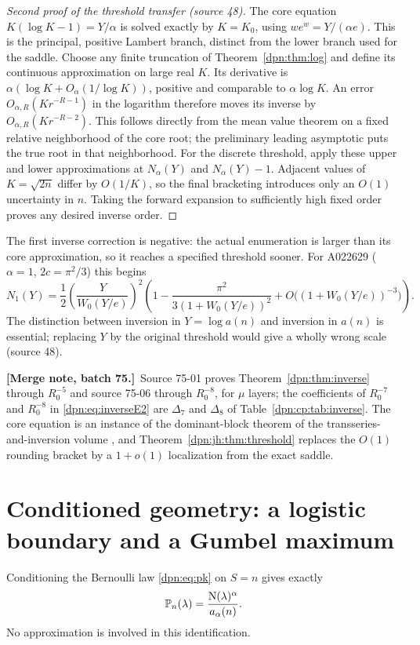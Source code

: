 \documentclass[11pt]{article}
\numberwithin{equation}{section}
\theoremstyle{definition}\newtheorem{definition}[theorem]{Definition}
\theoremstyle{remark}\newtheorem{remark}[theorem]{Remark}
\newcommand{\normp}{\operatorname{N}}
\newcommand{\src}[1]{\textup{(source #1)}}
\newcommand{\mergenoteb}[1]{\par\smallskip\noindent\textbf{[Merge note, batch 75.]}\ #1\par\smallskip}
\begin{document}
\begin{proof}[Second proof of the threshold transfer \src{48}]
The core equation $K(\log K-1)=Y/\alpha$ is solved exactly by $K=K_0$, using
$we^w=Y/(\alpha e)$.  This is the principal, positive Lambert branch, distinct
from the lower branch used for the saddle.  Choose any finite truncation of
Theorem~\ref{dpn:thm:log} and define its continuous approximation on large
real $K$.  Its derivative is $\alpha(\log K+O_\alpha(1/\log K))$, positive and
comparable to $\alpha\log K$.  An error $O_{\alpha,R}(Kr^{-R-1})$ in the
logarithm therefore moves its inverse by $O_{\alpha,R}(Kr^{-R-2})$.  This
follows directly from the mean value theorem on a fixed relative neighborhood
of the core root; the preliminary leading asymptotic puts the true root in
that neighborhood.  For the discrete threshold, apply these upper and lower
approximations at $N_\alpha(Y)$ and $N_\alpha(Y)-1$.  Adjacent values of
$K=\sqrt{2n}$ differ by $O(1/K)$, so the final bracketing introduces only an
$O(1)$ uncertainty in $n$.  Taking the forward expansion to sufficiently high
fixed order proves any desired inverse order.
\end{proof}

The first inverse correction is negative: the actual enumeration is larger
than its core approximation, so it reaches a specified threshold sooner.  For
A022629 ($\alpha=1$, $2c=\pi^2/3$) this begins
\begin{equation}\label{dpn:48:eq:N1}
 N_1(Y)=\frac12\left(\frac{Y}{W_0(Y/e)}\right)^2
 \left(1-\frac{\pi^2}{3(1+W_0(Y/e))^2}
          +O\bigl((1+W_0(Y/e))^{-3}\bigr)\right).
\end{equation}
The distinction between inversion in $Y=\log a(n)$ and inversion in $a(n)$ is
essential; replacing $Y$ by the original threshold would give a wholly wrong
scale \src{48}.
\mergenoteb{Source 75-01 proves Theorem~\ref{dpn:thm:inverse} through
$R_0^{-5}$ and source 75-06 through $R_0^{-8}$, for $\mu$ layers; the
coefficients of $R_0^{-7}$ and $R_0^{-8}$ in \eqref{dpn:eq:inverseE2} are
$\Delta_7$ and $\Delta_8$ of Table~\ref{dpn:cp:tab:inverse}.  The core
equation is an instance of the dominant-block theorem of the
transseries-and-inversion volume \cite{tai}, and
Theorem~\ref{dpn:jh:thm:threshold} replaces the $O(1)$ rounding bracket by a
$1+o(1)$ localization from the exact saddle.}

\section{Conditioned geometry: a logistic boundary and a Gumbel maximum}
Conditioning the Bernoulli law \eqref{dpn:eq:pk} on $S=n$ gives exactly
\begin{equation}\label{dpn:eq:conditioned}
 \Prob_n(\lambda)=\frac{\normp(\lambda)^\alpha}{a_\alpha(n)}.
\end{equation}
No approximation is involved in this identification.
\end{document}
